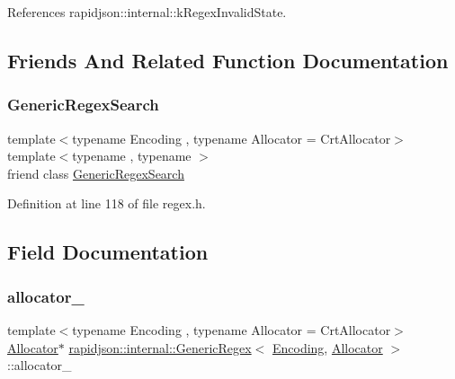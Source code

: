 References rapidjson\+::internal\+::k\+Regex\+Invalid\+State.



\subsection{Friends And Related Function Documentation}
\mbox{\label{classrapidjson_1_1internal_1_1_generic_regex_a919008cc046ab9f1c09609f1fc143986}} 
\subsubsection{\texorpdfstring{GenericRegexSearch}{GenericRegexSearch}}
{\footnotesize\ttfamily template$<$typename Encoding , typename Allocator  = Crt\+Allocator$>$ \\
template$<$typename , typename $>$ \\
friend class \mbox{\hyperlink{classrapidjson_1_1internal_1_1_generic_regex_search}{Generic\+Regex\+Search}}\hspace{0.3cm}{\ttfamily [friend]}}



Definition at line 118 of file regex.\+h.



\subsection{Field Documentation}
\mbox{\label{classrapidjson_1_1internal_1_1_generic_regex_a3545553143f3737cde47cbcd3c6ea111}} 
\subsubsection{\texorpdfstring{allocator\_}{allocator\_}}
{\footnotesize\ttfamily template$<$typename Encoding , typename Allocator  = Crt\+Allocator$>$ \\
\mbox{\hyperlink{classrapidjson_1_1_allocator}{Allocator}}$\ast$ \mbox{\hyperlink{classrapidjson_1_1internal_1_1_generic_regex}{rapidjson\+::internal\+::\+Generic\+Regex}}$<$ \mbox{\hyperlink{classrapidjson_1_1_encoding}{Encoding}}, \mbox{\hyperlink{classrapidjson_1_1_allocator}{Allocator}} $>$\+::allocator\+\_\+\hspace{0.3cm}{\ttfamily [private]}}



